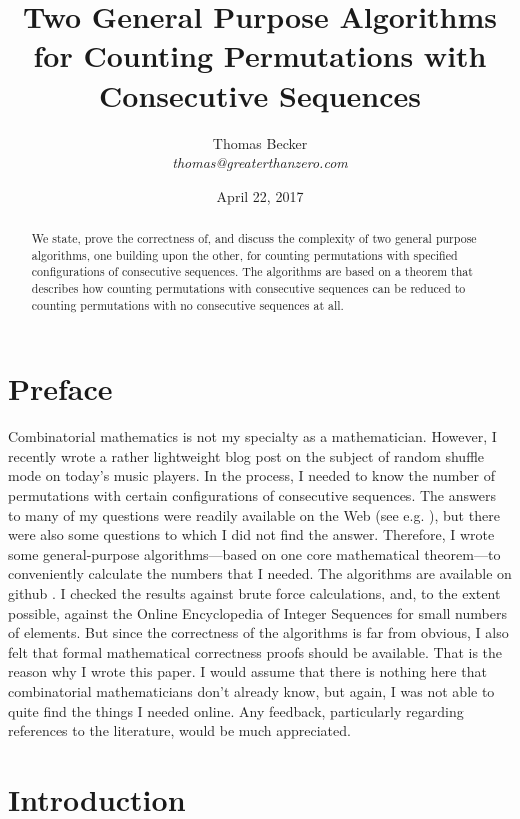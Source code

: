 \documentclass{article}
\begin{document}
\author{Thomas Becker\\ {\small \it thomas@greaterthanzero.com}}
\title{Two General Purpose Algorithms for Counting Permutations with Consecutive Sequences}
\date{\small April 22, 2017}
\maketitle

\begin{abstract}
  We state, prove the correctness of, and discuss the complexity of two general
  purpose algorithms, one building upon the other, for counting permutations with
  specified configurations of consecutive sequences. The algorithms are based on
  a theorem that describes how counting permutations with consecutive sequences can
  be reduced to counting permutations with no consecutive sequences at all.
\end{abstract}

\section{Preface}
Combinatorial mathematics is not my specialty as a mathematician. However, I recently wrote
a rather lightweight blog post \cite{BlogPost} on the subject of random shuffle mode on today's
music players. In the process, I needed to know the number of permutations with certain
configurations of consecutive sequences. The answers to many of my questions were readily
available on the Web (see e.g. \cite{Oeis}),
but there were also some questions to which I did not find the answer. Therefore, I
wrote some general-purpose algorithms---based on one core mathematical theorem---to conveniently
calculate the numbers that I needed. The algorithms are available on github \cite{Algos}.
I checked the results against brute force calculations, and, to the extent possible, against
the Online Encyclopedia of Integer Sequences \cite{Oeis} for small numbers of elements.
But since the correctness of the algorithms
is far from obvious, I also felt that formal mathematical correctness proofs should be available.
That is the reason why I wrote this paper. I would assume that there is nothing here that
combinatorial mathematicians don't already know, but again, I was not able to quite find the things I
needed online. Any feedback, particularly regarding references to
the literature, would be much appreciated.

\section{Introduction}
\end{document}
